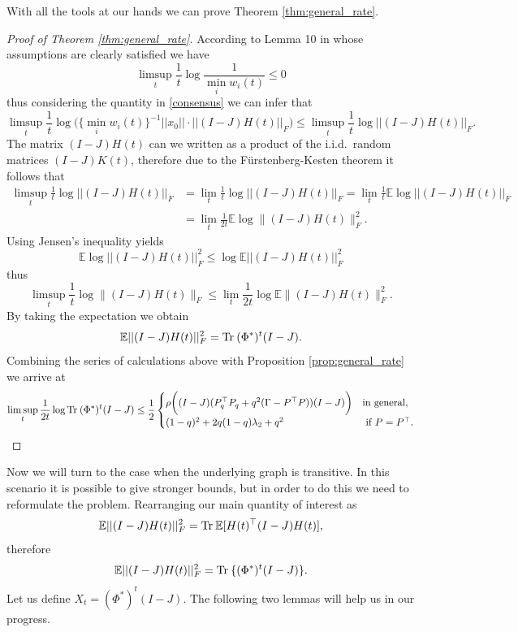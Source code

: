 \documentclass[a4paper,12pt]{article}
\def\tr{\mathrm{Tr}\hspace{0.8mm}}
\begin{document}
\noindent With all the tools at our hands we can prove Theorem \ref{thm:general_rate}. 
\begin{proof}[Proof of Theorem \ref{thm:general_rate}]
	According to Lemma 10 in \cite{gerencser2022computable} whose assumptions are clearly satisfied we have
	$$ \limsup_t \frac1t \log \frac1{\min_i w_i(t)} \leq 0 $$
	thus considering the quantity in \eqref{consensus} we can infer that
	$$ \limsup_t \frac1t \log \big(\{\min_i w_i(t)\}^{-1}||x_0||\cdot  ||(I-J) H(t)||_F \big)\leq \limsup_t \frac1t \log ||(I-J)H(t)||_F .$$ The matrix $(I-J)H(t)$ can we written as a product of the i.i.d.\ random matrices $(I-J)K(t)$, therefore due to the Fürstenberg-Kesten theorem it follows that
	\begin{align*}
		\limsup_t \frac1t \log ||(I-J)H(t)||_F &= \lim_t \frac1t \log ||(I-J)H(t)||_F = \lim_t\frac1t\mathbb E\log||(I-J)H(t)||_F \\ 
		& = \lim_t \frac1{2t} \mathbb E \log \| (I-J)H(t) \|_F^2 .
	\end{align*}
	Using Jensen's inequality yields
	$$ \mathbb E \log ||(I-J)H(t)||^2_F \leq \log \mathbb E||(I-J)H(t)||_F^2 $$
	thus 
	$$ \limsup_t \frac1t \log \|(I-J)H(t)\|_F \leq \lim_t \frac1{2t} \log \mathbb E \|(I-J)H(t)\|_F^2.  $$
	By taking the expectation we obtain
	$$ \mathbb E ||(I-J)H(t)||_F^2 = \tr (\Phi^*)^t(I-J). $$
	Combining the series of calculations above with Proposition \ref{prop:general_rate} we arrive at
	$$ \limsup_t \frac1{2t} \log \tr (\Phi^*)^t(I-J)\leq \frac12 \begin{cases}
		\rho\bigg((I-J)(P_q^\top P_q + q^2(\Gamma - P^\top P))(I-J)\bigg) & \mbox{in general,} \\
		(1-q)^2 + 2q(1-q)\lambda_2 + q^2 & \mbox{ if } P=P^\top.
	\end{cases}    $$
	
\end{proof}

Now we will turn to the case when the underlying graph is transitive. In this scenario it is possible to give stronger bounds, but in order to do this we need to reformulate the problem. Rearranging our main quantity of interest as
$$ \mathbb E||(I-J)H(t)||_F^2  = \tr \mathbb E [H(t)^\top(I-J)H(t)], $$
therefore
$$\mathbb E||(I-J)H(t)||_F^2 = \tr \{(\Phi^*)^t(I-J)\}. $$ Let us define $X_t =(\Phi^*)^t(I-J). $ The following two lemmas will help us in our progress.
\end{document}
